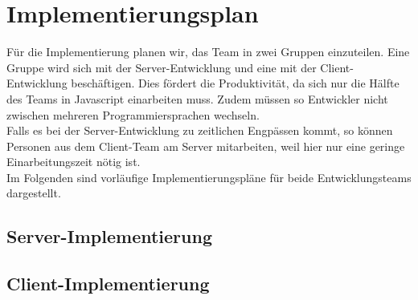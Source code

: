 \def\pgfcalendarweekdayletter#1{%
	\ifcase#1M\or D\or M\or D\or F\or S\or S\fi%
} 
\def\pgfcalendarmonthname#1{%
	\ifcase#1 Dezember \or Januar\or Februar\or März\or April\or Mai\or Juni\or Juli \or August \or S. \or Oktober \or November \or Dezember\fi%
}  


\section{Implementierungsplan}
Für die Implementierung planen wir, das Team in zwei Gruppen einzuteilen. Eine Gruppe wird sich mit der Server-Entwicklung und eine mit der Client-Entwicklung beschäftigen. Dies fördert die Produktivität, da sich nur die Hälfte des Teams in Javascript einarbeiten muss. Zudem müssen so Entwickler nicht zwischen mehreren Programmiersprachen wechseln.\\
Falls es bei der Server-Entwicklung zu zeitlichen Engpässen kommt, so können Personen aus dem Client-Team am Server mitarbeiten, weil hier nur eine geringe Einarbeitungszeit nötig ist. \\
Im Folgenden sind vorläufige Implementierungspläne für beide Entwicklungsteams dargestellt.
\subsection{Server-Implementierung}



\subsection{Client-Implementierung}



	
